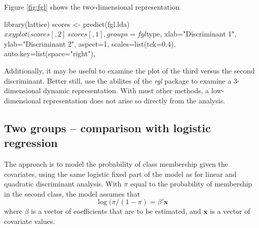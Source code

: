 Figure \ref{fig:fgl} shows the two-dimensional
representation.
\begin{Schunk}
\begin{Sinput}
library(lattice)
scores <- predict(fgl.lda)$x
xyplot(scores[,2] ~ scores[,1], groups=fgl$type,
       xlab="Discriminant 1",
       ylab="Discriminant 2",
       aspect=1, scales=list(tck=0.4),
       auto.key=list(space="right"),
\end{Sinput}
\end{Schunk}

Additionally, it may be useful to examine the plot of the third
versus the second discriminant.  Better still, use the abilites of the
\textit{rgl} package to examine a 3-dimensional dynamic representation.
With most other methods, a low-dimensional representation does not
arise so directly from the analysis.

\subsection*{Two groups -- comparison with logistic regression}


The approach is to model the probability of class membership given
the covariates, using the same logistic fixed part of the model as
for linear and quadratic discriminant analysis.  With $\pi$ equal
to the probability of membership in the second class, the model
assumes that
\[ \log(\pi/(1-\pi) = \beta' \mathbf{x}\]
where $\beta$ is a vector of  coefficients that are to be estimated,
and $\mathbf{x}$ is a vector of covariate values.

